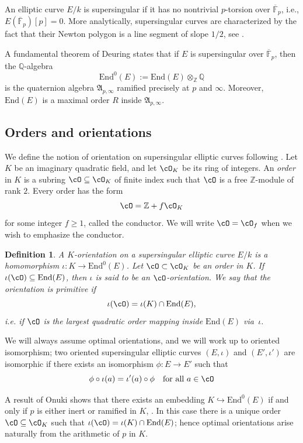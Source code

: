 \documentclass[10pt]{amsart}
\theoremstyle{theostyle}
\newtheorem{definition}[theorem]{Definition}
\newcommand{\FF}{\mathbb{F}} \newcommand{\HH}{\mathbb{H}}
\newcommand{\QQ}{\mathbb{Q}} \newcommand{\RR}{\mathbb{R}}
\newcommand{\ZZ}{\mathbb{Z}}
\newcommand{\End}{\mathrm{End}}
\begin{document}
An elliptic curve
$E/k$ is supersingular if
it has no nontrivial $p$-torsion over
$\overline{\FF}_{p}$, i.e.,
$E(\overline{\FF}_{p})[p] = 0$.
More analytically, supersingular curves are characterized by the fact that their Newton polygon is a line segment of slope $1/2$, see \cite{Pries:NewtPoly}.

A fundamental theorem of Deuring \cite{Deuring} states that if $E$ is supersingular over
$\overline{\FF}_{p}$, then the $\QQ$-algebra
\[
\End^0(E) := \End(E)\otimes_\ZZ \QQ
\]
is the quaternion algebra $\mathfrak{A}_{p,\infty}$ ramified precisely at
$p$ and $\infty$. Moreover, $\End(E)$ is a maximal
order $R$ inside $\mathfrak{A}_{p,\infty}$.

\subsection{Orders and orientations}\label{Subsection:OrdersOrientations}

We define the notion of orientation on supersingular elliptic curves following \cite{OSIDH}.
Let $K$ be an imaginary quadratic field, and let $\cO_K$ be its ring of
integers. An \emph{order} in $K$ is a subring $\cO\subseteq\cO_K$ of finite
index such that $\cO$ is a free $\ZZ$-module of rank $2$. Every order has the
form
\[
\cO = \ZZ + f\cO_K
\]
for some integer $f\ge 1$, called the conductor. We will write
$\cO = \cO_f$ when we wish to emphasize the conductor.


\begin{definition}
A $K$-orientation on a supersingular elliptic curve $E/k$ is a homomorphism $\iota : K\to \End^0(E)$.
Let $\cO\subset \cO_K$ be an order in $K$. If $\iota(\cO)\subseteq\End(E)$, then $\iota$ is said to be an
$\cO$-orientation.  
We say that the orientation is primitive if
\[
\iota(\cO)= \iota(K)\cap \End(E),
\]
i.e. if $\cO$ is the largest quadratic order mapping inside $\End(E)$ via~$\iota$.
\end{definition}


We will always assume optimal orientations, and we will work up to oriented
isomorphism; two oriented supersingular elliptic curves $(E,\iota)$ and $(E',\iota')$ are
isomorphic if there exists an isomorphism $\phi:E\to E'$ such that $$\phi\circ \iota(a) = \iota'(a)\circ\phi \quad \text{for all } a\in\cO$$

A result of Onuki shows that
there exists an embedding $K\hookrightarrow \End^0(E)$ if and only if $p$ is
either inert or ramified in $K$, \cite{Onuki:OSIDH}. In this case there is a unique order
$\cO\subseteq\cO_K$ such that $\iota(\cO)=\iota(K)\cap \End(E)$; hence optimal orientations arise naturally from the arithmetic of $p$ in $K$.
\end{document}
